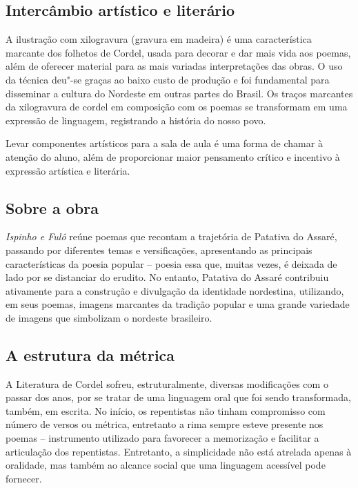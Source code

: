 \documentclass[12pt]{extarticle}
\begin{document}
\subsection{Intercâmbio artístico e literário}

A ilustração com xilogravura (gravura em madeira) é uma característica
marcante dos folhetos de Cordel, usada para decorar e dar mais vida aos
poemas, além de oferecer material para as mais variadas interpretações
das obras. O uso da técnica deu"-se graças ao baixo custo de produção e
foi fundamental para disseminar a cultura do Nordeste em outras partes
do Brasil. Os traços marcantes da xilogravura de cordel em composição
com os poemas se transformam em uma expressão de linguagem, registrando
a história do nosso povo.

Levar componentes artísticos para a sala de aula é uma forma de chamar à
atenção do aluno, além de proporcionar maior pensamento crítico e
incentivo à expressão artística e literária.


\subsection{Sobre a obra}

\emph{Ispinho e Fulô} reúne poemas que recontam a trajetória de Patativa
do Assaré, passando por diferentes temas e versificações, apresentando
as principais características da poesia popular -- poesia essa que,
muitas vezes, é deixada de lado por se distanciar do erudito. No
entanto, Patativa do Assaré contribuiu ativamente para a construção e
divulgação da identidade nordestina, utilizando, em seus poemas, imagens
marcantes da tradição popular e uma grande variedade de imagens que
simbolizam o nordeste brasileiro.

\subsection{A estrutura da métrica}

A Literatura de Cordel sofreu, estruturalmente, diversas modificações
com o passar dos anos, por se tratar de uma linguagem oral que foi sendo
transformada, também, em escrita. No início, os repentistas não tinham
compromisso com número de versos ou métrica, entretanto a rima sempre
esteve presente nos poemas -- instrumento utilizado para favorecer a
memorização e facilitar a articulação dos repentistas. Entretanto, a
simplicidade não está atrelada apenas à oralidade, mas também ao alcance
social que uma linguagem acessível pode fornecer.
\end{document}
